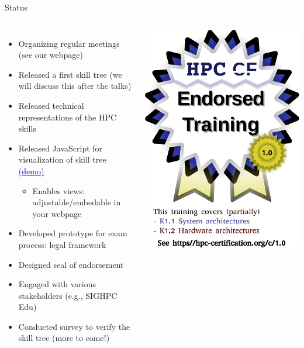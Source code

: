 \documentclass[compress,aspectratio=169]{beamer}
\newcommand{\hrefb}[2]{\href{#1}{\textcolor{blue}{#2}}}
\begin{document}
\begin{frame}{Status}

\begin{columns}
	\begin{itemize}
	\item Organizing regular meetings (see our webpage)
	\item Released a first skill tree (we will discuss this after the talks)
	\item Released technical representations of the HPC skills
	\item Released JavaScript for visualization of skill tree \hrefb{https://www.hpc-certification.org/skills/}{(demo)}
		\begin{itemize}
			\item Enables views: adjustable/embedable in your webpage
		\end{itemize}
	\item Developed prototype for exam process: legal framework
	\item Designed seal of endorsement
	\item Engaged with various stakeholders (e.g., SIGHPC Edu)
	\item Conducted survey to verify the skill tree (more to come!)
\end{itemize}

\includegraphics[width=\textwidth]{certified.pdf}
\end{columns}


\end{frame}
\end{document}
